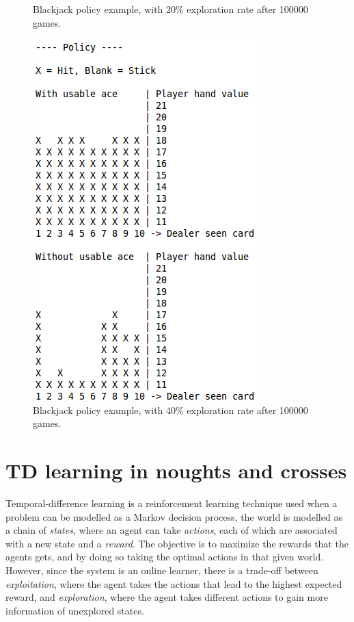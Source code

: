 \documentclass[12pt]{article}
\begin{document}
\begin{figure}[htbp!]
\begin{minipage}[t]{0.3\linewidth}
	\caption{Blackjack policy example, with 20\% exploration rate after 100000 games.}
	\label{fig:blackjack_0_2_Q}
\end{minipage}
\quad
\begin{minipage}[t]{0.3\linewidth}
	\includegraphics[scale=0.35]{images/blackjack_0_4_Q}
	\caption{Blackjack policy example, with 40\% exploration rate after 100000 games.}
	\label{fig:blackjack_0_4_Q}
\end{minipage}
\end{figure}

\section{TD learning in noughts and crosses}
\label{sec:td_ttt}

Temporal-difference learning\cite{Sutton1998} is a reinforcement learning technique used when a problem can be modelled as a Markov decision process, the world is modelled as a chain of \emph{states}, where an agent can take \emph{actions}, each of which are associated with a new state and a \emph{reward}.
The objective is to maximize the rewards that the agents gets, and by doing so taking the optimal actions in that given world.
However, since the system is an online learner, there is a trade-off between \emph{exploitation}, where the agent takes the actions that lead to the highest expected reward, and \emph{exploration}, where the agent takes different actions to gain more information of unexplored states.
\end{document}
